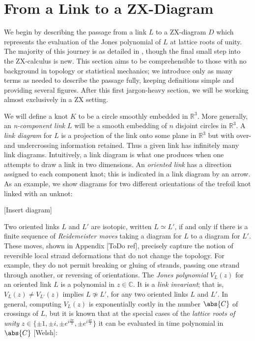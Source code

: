 \section{From a Link to a ZX-Diagram}

We begin by describing the passage from a link $L$ to a ZX-diagram $D$ which represents the evaluation of the Jones polynomial of $L$ at lattice roots of unity. The majority of this journey is as detailed in \cite{jones_tensors}, though the final small step into the ZX-calculus is new. This section aims to be comprehensible to those with no background in topology or statistical mechanics; we introduce only as many terms as needed to describe the passage fully, keeping definitions simple and providing several figures. After this first jargon-heavy section, we will be working almost exclusively in a ZX setting.\newline

We will define a knot $K$ to be a circle smoothly embedded in $\mathbb{R}^3$. More generally, an \textit{n-component link} $L$ will be a smooth embedding of $n$ disjoint circles in $\mathbb{R}^3$. A \textit{link diagram} for $L$ is a projection of the link onto some plane in $\mathbb{R}^3$ but with over- and undercrossing information retained. Thus a given link has infinitely many link diagrams. Intuitively, a link diagram is what one produces when one attempts to draw a link in two dimensions. An \textit{oriented link} has a direction assigned to each component knot; this is indicated in a link diagram by an arrow. As an example, we show diagrams for two different orientations of the trefoil knot linked with an unknot:\newline

[Insert diagram]\newline

Two oriented links $L$ and $L'$ are isotopic, written $L \simeq L'$, if and only if there is a finite sequence of \textit{Reidemeister moves} taking a diagram for $L$ to a diagram for $L'$. These moves, shown in Appendix [ToDo ref], precisely capture the notion of reversible local strand deformations that do not change the topology. For example, they do not permit breaking or gluing of strands, passing one strand through another, or reversing of orientations. The \textit{Jones polynomial} $V_L(z)$ for an oriented link $L$ is a polynomial in $z \in \mathbb{C}$. It is a \textit{link invariant}; that is, $V_L(z) \neq V_{L'}(z)$ implies $L \not\simeq L'$, for any two oriented links $L$ and $L'$. In general, computing $V_L(z)$ is exponentially costly in the number $\abs{C}$ of crossings of $L$, but it is known that at the special cases of the \textit{lattice roots of unity} $z \in \{\pm 1, \pm i, \pm e^{i\frac{2\pi}{3}}, \pm e^{i\frac{4\pi}{3}}\}$ it can be evaluated in time polynomial in $\abs{C}$ [Welsh]:\newline

